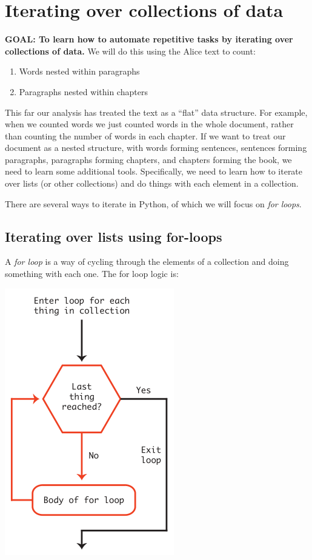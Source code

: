 \documentclass[]{book}
\providecommand{\tightlist}{%
  \setlength{\itemsep}{0pt}\setlength{\parskip}{0pt}}
\begin{document}
\section{Iterating over collections of
data}\label{iterating-over-collections-of-data}

\textbf{GOAL: To learn how to automate repetitive tasks by iterating
over collections of data.} We will do this using the Alice text to
count:

\begin{enumerate}
\def\labelenumi{\arabic{enumi}.}
\tightlist
\item
  Words nested within paragraphs
\item
  Paragraphs nested within chapters
\end{enumerate}

This far our analysis has treated the text as a ``flat'' data structure.
For example, when we counted words we just counted words in the whole
document, rather than counting the number of words in each chapter. If
we want to treat our document as a nested structure, with words forming
sentences, sentences forming paragraphs, paragraphs forming chapters,
and chapters forming the book, we need to learn some additional tools.
Specifically, we need to learn how to iterate over lists (or other
collections) and do things with each element in a collection.

There are several ways to iterate in Python, of which we will focus on
\emph{for loops}.

\subsection{Iterating over lists using
for-loops}\label{iterating-over-lists-using-for-loops}

A \emph{for loop} is a way of cycling through the elements of a
collection and doing something with each one. The for loop logic is:

\includegraphics{Python/PythonIntro/images/for_loop_pic_small.png}
\end{document}
